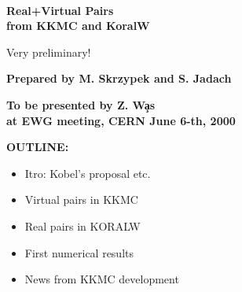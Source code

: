 \documentclass[dvips,portrait]{seminar}             %
\begin{document}


\def\title{\Color{PineGreen} Pairs KKMC+KoralW}

\begin{slide*}                                                %

\hbox{ }
\vspace{5mm}

\begin{center}
{\huge\color{red}\bf       Real+Virtual Pairs\\
                           from KKMC and KoralW}\\
\end{center}

\begin{center}
{\LARGE\color{red}          Very preliminary!}
\end{center}

\vspace{1mm}
\begin{center}
{\large\color{blue}\bf     Prepared by M. Skrzypek and S. Jadach}
\end{center}


\vspace{1mm}
\begin{center}
{\large\color{blue}\bf     To be presented by Z. W\c{a}s\\
	                   at EWG meeting, CERN June 6-th, 2000}
\end{center}

\vspace{2mm}
{\large{}\bf
OUTLINE:
\begin{itemize}
\item Itro: Kobel's proposal etc.
\item Virtual pairs in KKMC
\item Real pairs in KORALW
\item First numerical results
\item News from KKMC development
\end{itemize}
}

\vfill
\end{slide*}   %
\end{document}
